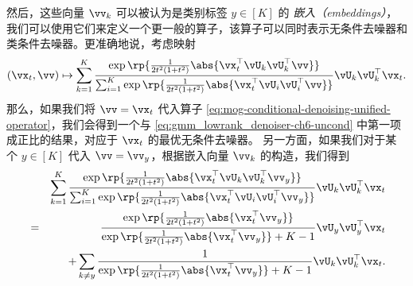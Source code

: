 \documentclass[../../book-main_zh.tex]{subfiles}
\begin{document}
\begin{example}
    然后，这些向量 $\vv_k$ 可以被认为是类别标签 $y \in [K]$ 的 \textit{嵌入（embeddings）}，我们可以使用它们来定义一个更一般的算子，该算子可以同时表示无条件去噪器和类条件去噪器。更准确地说，考虑映射
    \begin{equation}\label{eq:mog-conditional-denoising-unified-operator}
        (\vx_t, \vv) \mapsto
        \sum_{k = 1}^{K}\frac{
            \exp\rp{\frac{1}{2t^{2}(1
            + t^{2})} \abs{\vx_t^\top \vU_k \vU_k^\top \vv}}
        }
        {
            \sum_{i
            = 1}^{K}\exp\rp{\frac{1}{2t^{2}(1
            + t^{2})}\abs{\vx_t^\top \vU_i \vU_i^\top \vv}}
        }
        \vU_{k}\vU_{k}^{\top}\vx_t.
    \end{equation}
    那么，如果我们将 $\vv = \vx_t$ 代入算子 \eqref{eq:mog-conditional-denoising-unified-operator}，我们会得到一个与 \eqref{eq:gmm_lowrank_denoiser-ch6-uncond} 中第一项成正比的结果，对应于 $\vx_t$ 的最优无条件去噪器。
    另一方面，如果我们对于某个 $y \in [K]$ 代入 $\vv = \vv_y$，根据嵌入向量 $\vv_k$ 的构造，我们得到
    \begin{eqnarray}
        &&\sum_{k = 1}^{K}
        \frac{
            \exp\rp{\frac{1}{2t^{2}(1
            + t^{2})}\abs{\vx_t^\top \vU_k \vU_k^\top \vv_y}}
        }
        {
            \sum_{i
            = 1}^{K}\exp\rp{\frac{1}{2t^{2}(1
            + t^{2})}\abs{\vx_t^\top \vU_i \vU_i^\top \vv_y}}
        }
        \vU_{k}\vU_{k}^{\top}\vx_t \nonumber \\
        &=&
        \frac{
            \exp\rp{\frac{1}{2t^{2}(1
            + t^{2})}\abs{\vx_t^\top \vv_y}}
        }
        {
            \exp\rp{\frac{1}{2t^{2}(1
            + t^{2})}\abs{\vx_t^\top \vv_y}}
            + K-1
        }
        \vU_{y}\vU_{y}^{\top}\vx_t
        \\
        && +
        \sum_{k \neq y}
        \frac{
            1
        }
        {
            \exp\rp{\frac{1}{2t^{2}(1
            + t^{2})}\abs{\vx_t^\top \vv_y}}
            + K-1
        }
        \vU_{k}\vU_{k}^{\top}\vx_t.
    \end{eqnarray}


\end{example}
\end{document}
